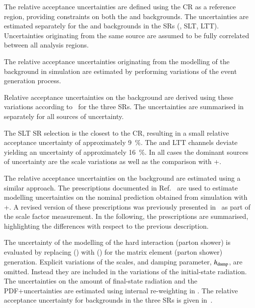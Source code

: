 

The relative acceptance uncertainties are defined using the \ZHF CR as a
reference region, providing constraints on both the \ZHF and \ttbar
backgrounds. The uncertainties are estimated separately for the \ZHF and \ttbar
backgrounds in the SRs (\hadhad, \lephad SLT, \lephad LTT). Uncertainties
originating from the same source are assumed to be fully correlated between all
analysis regions.

The relative acceptance uncertainties originating from the modelling of the \ZHF
background in simulation are estimated by performing variations of the event
generation process.


Relative acceptance uncertainties on the \ZHF background are derived using these
variations according to~ for the three
SRs. The uncertainties are summarised in~
separately for all sources of uncertainty.

The \lephad SLT SR selection is the closest to the \ZHF CR, resulting in a small
relative acceptance uncertainty of approximately \SI{9}{\percent}. The \hadhad
and \lephad LTT channels deviate yielding an uncertainty of approximately
\SI{16}{\percent}. In all cases the dominant sources of uncertainty are the
scale variations as well as the comparison with
\MGNLO+\PYTHIA[8].

The relative acceptance uncertainties on the \ttbar background are estimated
using a similar approach. The prescriptions documented in
Ref.~\cite{ATL-PHYS-PUB-2020-023} are used to estimate modelling uncertainties
on the nominal prediction obtained from simulation with
\POWHEGBOX[v2]+\PYTHIA[8]. A revised version of these prescriptions was
previously presented in~ as part of the
\ttbarFakes scale factor measurement. In the following, the prescriptions are
summarised, highlighting the differences with respect to the previous
description.

The uncertainty of the modelling of the hard interaction (parton shower) is
evaluated by replacing \POWHEGBOX[v2] (\PYTHIA[8]) with \MGNLO (\HERWIG[7]) for
the matrix element (parton shower) generation. Explicit variations of the
scales, and \PYTHIA[8] damping parameter, $h_\mathrm{damp}$, are omitted. Instead they
are included in the variations of the initial-state radiation. The uncertainties
on the amount of final-state radiation and the PDF+\alphas uncertainties are
estimated using internal re-weighting in \PYTHIA[8]. The relative acceptance
uncertainty for \ttbar backgrounds in the three SRs is given
in~.

